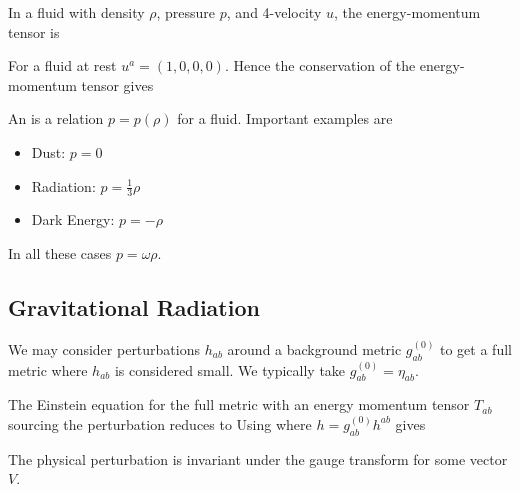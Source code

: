 \documentclass{article}
\begin{document}
\begin{definition}
In a fluid with density $\rho$, pressure $p$, and 4-velocity $u$, the energy-momentum tensor is 
\end{definition}

\begin{lemma}
For a fluid at rest $u^a = (1,0,0,0)$. Hence the conservation of the energy-momentum tensor gives 
\end{lemma}

\begin{definition}
An  is a relation $p = p(\rho)$ for a fluid. Important examples are 
\begin{itemize}
    \item Dust: $p = 0$
    \item Radiation: $p = \frac{1}{3}\rho$
    \item Dark Energy: $p = - \rho$
\end{itemize}
In all these cases $p = \omega \rho$. 
\end{definition}

\subsection{Gravitational Radiation}

We may consider perturbations $h_{ab}$ around a background metric $g_{ab}^{(0)}$ to get a full metric 
where $h_{ab}$ is considered small. We typically take $g_{ab}^{(0)} = \eta_{ab}$. 

\begin{lemma}
The Einstein equation for the full metric with an energy momentum tensor $T_{ab}$ sourcing the perturbation reduces to 
Using 
where $h = g_{ab}^{(0)} h^{ab}$ gives 
\end{lemma}

\begin{lemma}
The physical perturbation is invariant under the gauge transform 
for some vector $V$. 
\end{lemma}
\end{document}
